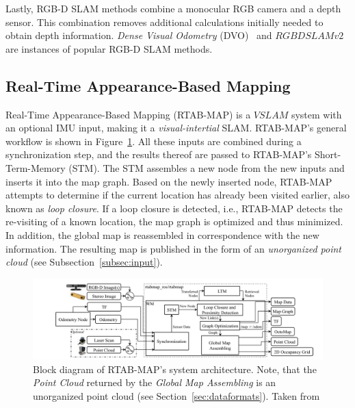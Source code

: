 \documentclass[main.tex]{subfiles}
\begin{document}
Lastly, RGB-D SLAM methods combine a monocular RGB camera and a depth sensor. This combination removes additional calculations
initially needed to obtain depth information. \textit{Dense Visual Odometry} (DVO)~\cite{Kerl_Sturm_Cremers_2013} and $RGBDSLAMv2$~\cite{endres20133} are instances of
popular RGB-D SLAM methods.




\subsection*{Real-Time Appearance-Based Mapping}
Real-Time Appearance-Based Mapping (RTAB-MAP) is a $VSLAM$ system with an optional IMU input, making it a \textit{visual-intertial} SLAM.
RTAB-MAP's general workflow is shown in Figure~\ref{fig:rtabmap}.
All these inputs are combined during a synchronization step, and the results thereof are passed to RTAB-MAP's Short-Term-Memory (STM).
The STM assembles a new node from the new inputs and inserts it into the map graph. Based on the newly inserted node, RTAB-MAP attempts to 
determine if the current location has already been visited earlier, also known as \textit{loop closure}.
If a loop closure is detected, i.e., RTAB-MAP detects the re-visiting of a known location, the map graph is optimized and thus minimized. 
In addition, the global map is reassembled in correspondence with the new information.
The resulting map is published in the form of an \textit{unorganized point cloud} (see Subsection~\ref{subsec:input}).

\begin{figure}[!h]
    \centering
    \includegraphics[width=15 cm]{images/rtabmap.png}
    \caption[RTAB-MAP Block Diagram]{Block diagram of RTAB-MAP's system architecture. Note, that the \textit{Point Cloud} returned by the \textit{Global Map Assembling}
        is an unorganized point cloud (see Section~\ref{sec:dataformats}).
        Taken from \cite[Figure~1]{Labbé_Michaud_2019}}
    \label{fig:rtabmap}
\end{figure}
\end{document}

